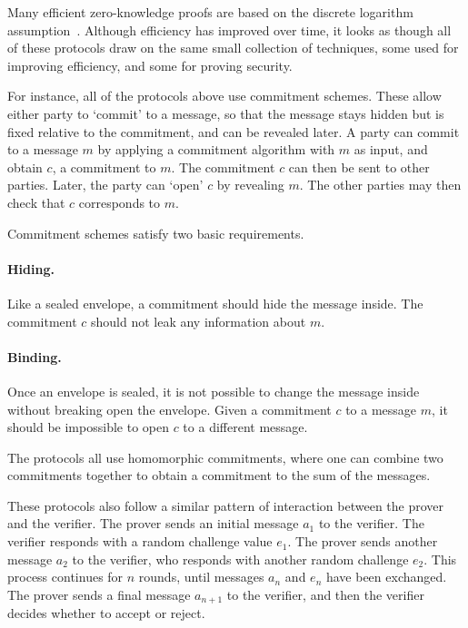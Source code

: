 Many efficient zero-knowledge proofs are based on the discrete logarithm assumption~\cite{Schnorr91,Cramer1998a,Groth2009b,Seo2011a,BootleCCGP16,BunzBBPWM18,GrothK15,BootleCCGGP15,BayerG13,BootleG18}. Although efficiency has improved over time, it looks as though all of these protocols draw on the same small collection of techniques, some used for improving efficiency, and some for proving security.

For instance, all of the protocols above use commitment schemes. These allow either party to `commit' to a message, so that the message stays hidden but is fixed relative to the commitment, and can be revealed later. A party can commit to a message $m$ by applying a commitment algorithm with $m$ as input, and obtain $c$, a commitment to $m$. The commitment $c$ can then be sent to other parties. Later, the party can `open' $c$ by revealing $m$. The other parties may then check that $c$ corresponds to $m$.

Commitment schemes satisfy two basic requirements.

\paragraph{Hiding.} Like a sealed envelope, a commitment should hide the message inside. The commitment $c$ should not leak any information about $m$.

\paragraph{Binding.} Once an envelope is sealed, it is not possible to change the message inside without breaking open the envelope. Given a commitment $c$ to a message $m$, it should be impossible to open $c$ to a different message.

The protocols all use homomorphic commitments, where one can combine two commitments together to obtain a commitment to the sum of the messages.

These protocols also follow a similar pattern of interaction between the prover and the verifier. The prover sends an initial message $a_1$ to the verifier. The verifier responds with a random challenge value $e_1$. The prover sends another message $a_2$ to the verifier, who responds with another random challenge $e_2$. This process continues for $n$ rounds, until messages $a_n$ and $e_n$ have been exchanged. The prover sends a final message $a_{n+1}$ to the verifier, and then the verifier decides whether to accept or reject.

